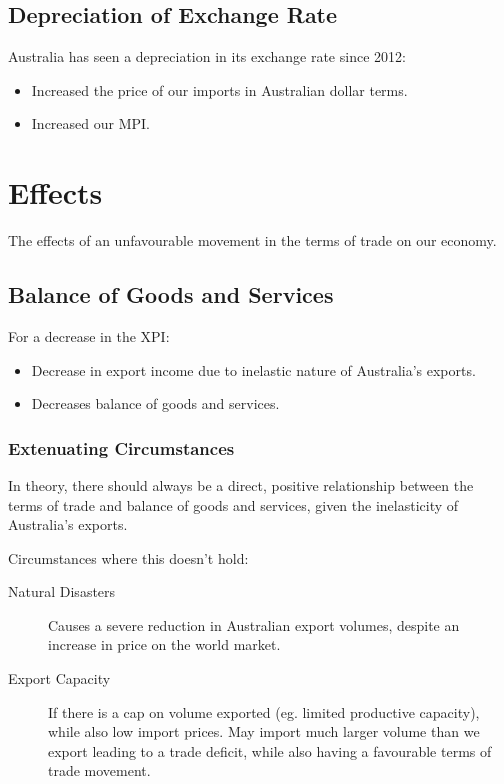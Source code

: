 \documentclass[a4paper,11pt]{report}
\begin{document}
\subsection{Depreciation of Exchange Rate}

Australia has seen a depreciation in its exchange rate since 2012:

\begin{itemize}
\item Increased the price of our imports in Australian dollar terms.
\item Increased our MPI.
\end{itemize}


\section{Effects}

The effects of an unfavourable movement in the terms of trade on our economy.

\subsection{Balance of Goods and Services}

For a decrease in the XPI:

\begin{itemize}
\item Decrease in export income due to inelastic nature of Australia's exports.
\item Decreases balance of goods and services.
\end{itemize}

\subsubsection{Extenuating Circumstances}

In theory, there should always be a direct, positive relationship between the
terms of trade and balance of goods and services, given the inelasticity of
Australia's exports.

Circumstances where this doesn't hold:

\begin{description}
\item [Natural Disasters] Causes a severe reduction in Australian export
	volumes, despite an increase in price on the world market.
\item [Export Capacity] If there is a cap on volume exported (eg. limited
	productive capacity), while also low import prices. May import much larger
	volume than we export leading to a trade deficit, while also having a
	favourable terms of trade movement.
\end{description}
\end{document}
